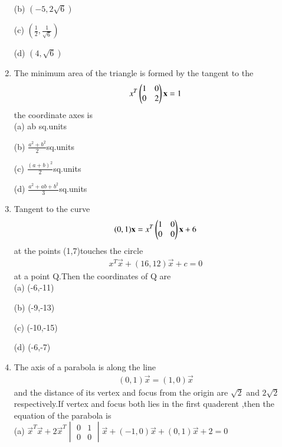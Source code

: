 \documentclass[journal,12pt,twocolumn]{IEEEtran}
\begin{document}
\begin{enumerate}
    \choice (b) $(-5,2\sqrt{6})$
    
    \choice (c) $(\frac{1}{2},\frac{1}{\sqrt{6}})$
    
    \choice (d) $(4,\sqrt{6})$\\
    
\item The minimum area of the triangle is formed by the tangent to the \begin{align}x^T \begin{pmatrix}1& 0 \\0 & 2\end{pmatrix} \mathbf x=1 \end{align} the coordinate axes is \\
    
    \choice (a) ab sq.units
    
    \choice (b) ${\frac{a^2+b^2}{2}}$sq.units 
    
    \choice (c) ${\frac{(a+b)^2}{2}}$sq.units 
    
    \choice (d) $\frac{a^2+ab+b^2}{3}$sq.units\\
    
    \item Tangent to the curve \begin{align}(0,1)\mathbf x= x^T\begin{pmatrix}1 & 0 \\0 & 0\end{pmatrix}\mathbf x+ 6\end{align} at the points (1,7)touches the circle \begin{align} x^T \vec x+(16,12)\vec x+c=0\end{align}at a point Q.Then the coordinates of Q are \\
    
    \choice (a) (-6,-11)
    
    \choice (b) (-9,-13)
    
    \choice (c) (-10,-15)
    
    \choice (d) (-6,-7)\\
    
    \item The axis of a parabola is along the line \begin{align}(0,1)\vec x= (1,0)\vec x\end{align} and the distance of its vertex and focus from the origin are $\sqrt{2}$ and $2\sqrt{2}$ respectively.If vertex and focus both lies in the first quaderent ,then the equation of the parabola is \\
    
    \choice (a) $\vec x^T\vec x+2\vec x^T\begin{vmatrix} 0&1\\0&0 \end{vmatrix} \vec x+(-1,0)\vec x+(0,1)\vec x+2=0$
    

\end{enumerate}
\end{document}
